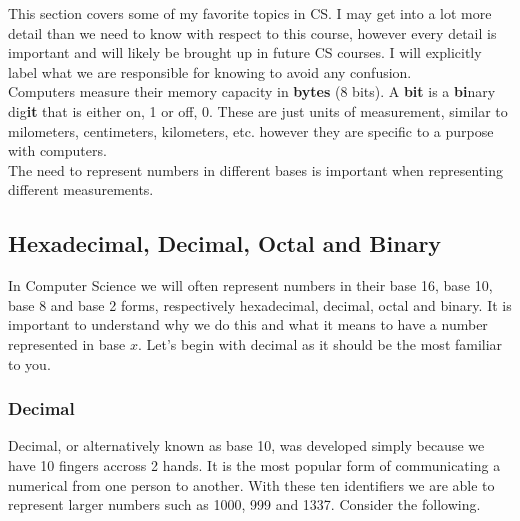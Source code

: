 
This section covers some of my favorite topics in CS. I may get into a lot more detail than we need to know with respect to this course, however every detail is important and will likely be brought up in future CS courses. I will explicitly label what we are responsible for knowing to avoid any confusion.\\

Computers measure their memory capacity in \textbf{bytes} (8 bits). A \textbf{bit} is a \textbf{bi}nary dig\textbf{it} that is either on, 1 or off, 0. These are just units of measurement, similar to milometers, centimeters, kilometers, etc. however they are specific to a purpose with computers.\\

The need to represent numbers in different bases is important when representing different measurements.

\subsection{Hexadecimal, Decimal, Octal and Binary}

In Computer Science we will often represent numbers in their base 16, base 10, base 8 and base 2 forms, respectively hexadecimal, decimal, octal and binary. It is important to understand why we do this and what it means to have a number represented in base $x$. Let's begin with decimal as it should be the most familiar to you.

\subsubsection*{Decimal}


Decimal, or alternatively known as base 10, was developed simply because we have 10 fingers accross 2 hands. It is the most popular form of communicating a numerical from one person to another. With these ten identifiers we are able to represent larger numbers such as 1000, 999 and 1337. Consider the following.\\


